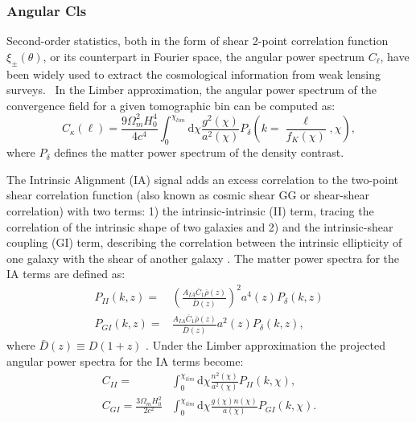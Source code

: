 \documentclass{aa}
\begin{document}
\subsubsection{Angular Cls
}
Second-order statistics, both in the form of shear 2-point correlation function $\xi_{\pm}(\theta)$, or its counterpart in Fourier space, the angular power spectrum $C_{\ell}$, have been widely used to extract the cosmological information from weak lensing surveys. \
In the Limber approximation, the angular power spectrum of the convergence field for a given tomographic bin can be computed as:
\begin{equation}
    C_{\kappa}(\ell)=\frac{9\Omega_m^2H_0^4}{4c^4}
    \int_0^{\chi_{lim}} \text{d}\chi 
    \frac{g^2(\chi)}{a^2(\chi)}P_{\delta}
    	\left( k=\frac{\ell}{f_K(\chi)},\chi \right),
\end{equation}
where $P_{\delta}$ defines the matter power spectrum of the density contrast.

The Intrinsic Alignment (IA) signal adds an excess correlation to the two-point shear correlation function (also known as cosmic shear GG or shear-shear correlation) with two terms: 1) the intrinsic-intrinsic (II) term, tracing the correlation of the intrinsic shape of two galaxies  and 2) and the intrinsic-shear coupling (GI) term, describing the correlation between the intrinsic ellipticity of one galaxy with the shear of another galaxy \citep{kilbinger2015cosmology}.
The matter power spectra for the IA terms are defined as:
\begin{align}
    P_{II}(k,z)=& \left ( \frac{A_{IA}\bar{C}_1\bar{\rho}(z)}{\bar{D}(z)} \right)^2 a^{4}(z)P_{\delta}(k,z) 
    \\
    P_{GI}(k,z)=&  \frac{A_{IA}\bar{C}_1\bar{\rho}(z)}{\bar{D}(z)} a^{2}(z)P_{\delta}(k,z),
\end{align}
where $\bar{D}(z) \equiv D(1+z)$ \citep{harnois2021cosmic}.
Under the Limber
approximation the projected angular power spectra for the IA terms become:
\begin{align}
    C_{II}=& \int_0^{\chi_{lim}} \text{d}\chi 
    \frac{n^2(\chi)}{a^2(\chi)}P_{II}(k,\chi), \\
    C_{GI}= \frac{3\Omega_m H_0^2}{2c^2} & \int_0^{\chi_{lim}} \text{d}\chi 
    \frac{g(\chi)n(\chi)}{a(\chi)}P_{GI}(k,\chi).
\end{align}
\end{document}
